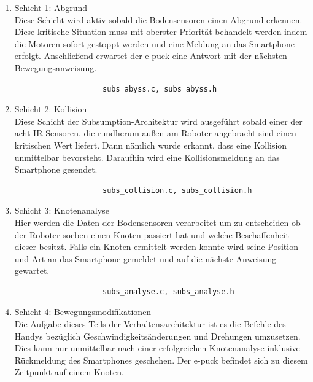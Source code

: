 \documentclass[10pt,a4paper]{article}
\begin{document}
			\begin{enumerate}
  				\item Schicht 1: Abgrund \\
					Diese Schicht wird aktiv sobald die Bodensensoren einen Abgrund erkennen. Diese kritische Situation muss mit oberster 
					Priorität behandelt werden indem die Motoren sofort gestoppt werden und eine Meldung an das Smartphone erfolgt. Anschließend
					erwartet der e-puck eine Antwort mit der nächsten Bewegungsanweisung.

					\begin{verbatim} 
					subs_abyss.c, subs_abyss.h
					\end{verbatim}

  				\item Schicht 2: Kollision \\
					Diese Schicht der Subsumption-Architektur wird ausgeführt sobald einer der acht IR-Sensoren, die rundherum außen am Roboter 
					angebracht sind einen kritischen Wert liefert. Dann nämlich wurde erkannt, dass eine Kollision unmittelbar bevorsteht. Daraufhin wird
					eine Kollisionsmeldung an das Smartphone gesendet.

					\begin{verbatim}  
					subs_collision.c, subs_collision.h
					\end{verbatim}

				\item Schicht 3: Knotenanalyse \\
					Hier werden die Daten der Bodensensoren verarbeitet um zu entscheiden ob der Roboter soeben einen Knoten passiert hat und welche
					Beschaffenheit dieser besitzt. Falls ein Knoten ermittelt werden konnte wird seine	Position und Art an das Smartphone gemeldet und auf
					die nächste Anweisung gewartet.					

					\begin{verbatim}  
					subs_analyse.c, subs_analyse.h
					\end{verbatim}

				\item Schicht 4: Bewegungsmodifikationen \\
					Die Aufgabe dieses Teils der Verhaltensarchitektur ist es die Befehle des Handys bezüglich Geschwindigkeitsänderungen und Drehungen
					umzusetzen. Dies kann nur unmittelbar nach einer erfolgreichen Knotenanalyse inklusive Rückmeldung des Smartphones geschehen. Der
					e-puck befindet sich zu diesem Zeitpunkt auf einem Knoten.			


\end{enumerate}
\end{document}
